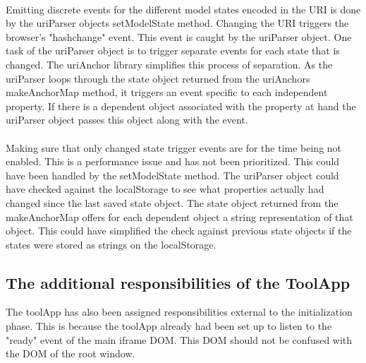 \documentclass[english]{ifimaster}
\begin{document}
\paragraph{}Emitting discrete events for the different model states encoded in the URI is done by the uriParser objects setModelState method. Changing the URI triggers the browser's "hashchange" event. This event is caught by the uriParser object. One task of the uriParser object is to trigger separate events for each state that is changed. The uriAnchor library simplifies this process of separation. As the uriParser loops through the state object returned from the uriAnchors makeAnchorMap method, it triggers an event specific to each independent property. If there is a dependent object associated with the property at hand the uriParser object passes this object along with the event.



\paragraph{}Making sure that only changed state trigger events are for the time being not enabled. This is a performance issue and has not been prioritized. This could have been handled by the setModelState method. The uriParser object could have checked against the localStorage to see what properties actually had changed since the last saved state object. The state object returned from the makeAnchorMap offers for each dependent object a string representation of that object. This could have simplified the check against previous state objects if the states were stored as strings on the localStorage. 




\subsection{The additional responsibilities of the ToolApp}
\label{sec:toolApp}
The toolApp has also been assigned responsibilities external to the initialization phase. This is because the toolApp already had been set up to listen to the "ready" event of the main iframe DOM. This DOM should not be confused with the DOM of the root window. 
\end{document}
